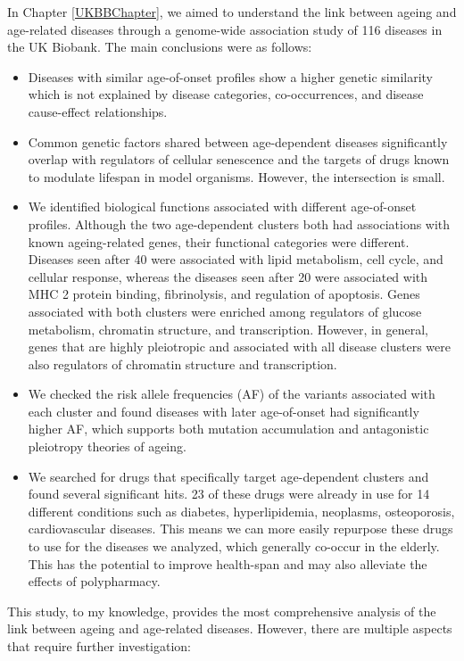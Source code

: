 \documentclass[12pt,twoside]{unicam}
\providecommand{\tightlist}{%
  \setlength{\itemsep}{0pt}\setlength{\parskip}{0pt}}
\begin{document}
In Chapter \ref{UKBBChapter}, we aimed to understand the link between ageing and age-related diseases through a genome-wide association study of 116 diseases in the UK Biobank. The main conclusions were as follows:

\begin{itemize}
\tightlist
\item
  Diseases with similar age-of-onset profiles show a higher genetic similarity which is not explained by disease categories, co-occurrences, and disease cause-effect relationships.
\item
  Common genetic factors shared between age-dependent diseases significantly overlap with regulators of cellular senescence and the targets of drugs known to modulate lifespan in model organisms. However, the intersection is small.
\item
  We identified biological functions associated with different age-of-onset profiles. Although the two age-dependent clusters both had associations with known ageing-related genes, their functional categories were different. Diseases seen after 40 were associated with lipid metabolism, cell cycle, and cellular response, whereas the diseases seen after 20 were associated with MHC 2 protein binding, fibrinolysis, and regulation of apoptosis. Genes associated with both clusters were enriched among regulators of glucose metabolism, chromatin structure, and transcription. However, in general, genes that are highly pleiotropic and associated with all disease clusters were also regulators of chromatin structure and transcription.
\item
  We checked the risk allele frequencies (AF) of the variants associated with each cluster and found diseases with later age-of-onset had significantly higher AF, which supports both mutation accumulation and antagonistic pleiotropy theories of ageing.
\item
  We searched for drugs that specifically target age-dependent clusters and found several significant hits. 23 of these drugs were already in use for 14 different conditions such as diabetes, hyperlipidemia, neoplasms, osteoporosis, cardiovascular diseases. This means we can more easily repurpose these drugs to use for the diseases we analyzed, which generally co-occur in the elderly. This has the potential to improve health-span and may also alleviate the effects of polypharmacy.
\end{itemize}

This study, to my knowledge, provides the most comprehensive analysis of the link between ageing and age-related diseases. However, there are multiple aspects that require further investigation:
\end{document}
